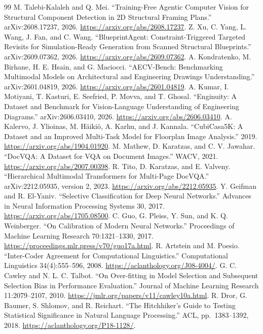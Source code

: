 \documentclass[11pt]{article}
\begin{document}
\begin{thebibliography}{99}
 M. Talebi-Kalaleh and Q. Mei. ``Training-Free Agentic Computer Vision for Structural Component Detection in 2D Structural Framing Plans.'' arXiv:2608.17237, 2026. \url{https://arxiv.org/abs/2608.17237}.
 Z. Xu, C. Yang, L. Wang, J. Fan, and C. Wang. ``BlueprintAgent: Constraint-Triggered Targeted Revisits for Simulation-Ready Generation from Scanned Structural Blueprints.'' arXiv:2609.07362, 2026. \url{https://arxiv.org/abs/2609.07362}.
 A. Kondratenko, M. Birhane, H. E. Hsain, and G. Maciocci. ``AECV-Bench: Benchmarking Multimodal Models on Architectural and Engineering Drawings Understanding.'' arXiv:2601.04819, 2026. \url{https://arxiv.org/abs/2601.04819}.
 A. Kumar, I. Motiyani, T. Kasturi, E. Seefried, P. Movva, and T. Ghosal. ``Enginuity: A Dataset and Benchmark for Vision-Language Understanding of Engineering Diagrams.'' arXiv:2606.03410, 2026. \url{https://arxiv.org/abs/2606.03410}.
 A. Kalervo, J. Ylioinas, M. H\"aiki\"o, A. Karhu, and J. Kannala. ``CubiCasa5K: A Dataset and an Improved Multi-Task Model for Floorplan Image Analysis.'' 2019. \url{https://arxiv.org/abs/1904.01920}.
 M. Mathew, D. Karatzas, and C. V. Jawahar. ``DocVQA: A Dataset for VQA on Document Images.'' WACV, 2021. \url{https://arxiv.org/abs/2007.00398}.
 R. Tito, D. Karatzas, and E. Valveny. ``Hierarchical Multimodal Transformers for Multi-Page DocVQA.'' arXiv:2212.05935, version 2, 2023. \url{https://arxiv.org/abs/2212.05935}.
 Y. Geifman and R. El-Yaniv. ``Selective Classification for Deep Neural Networks.'' Advances in Neural Information Processing Systems 30, 2017. \url{https://arxiv.org/abs/1705.08500}.
 C. Guo, G. Pleiss, Y. Sun, and K. Q. Weinberger. ``On Calibration of Modern Neural Networks.'' Proceedings of Machine Learning Research 70:1321--1330, 2017. \url{https://proceedings.mlr.press/v70/guo17a.html}.
 R. Artstein and M. Poesio. ``Inter-Coder Agreement for Computational Linguistics.'' Computational Linguistics 34(4):555--596, 2008. \url{https://aclanthology.org/J08-4004/}.
 G. C. Cawley and N. L. C. Talbot. ``On Over-fitting in Model Selection and Subsequent Selection Bias in Performance Evaluation.'' Journal of Machine Learning Research 11:2079--2107, 2010. \url{https://jmlr.org/papers/v11/cawley10a.html}.
 R. Dror, G. Baumer, S. Shlomov, and R. Reichart. ``The Hitchhiker's Guide to Testing Statistical Significance in Natural Language Processing.'' ACL, pp.\ 1383--1392, 2018. \url{https://aclanthology.org/P18-1128/}.

\end{thebibliography}
\end{document}
